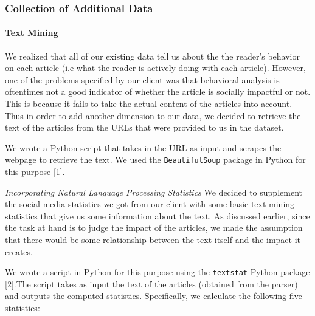 \documentclass[10pt,letterpaper]{article}
\begin{document}
\hypertarget{collection-of-additional-data}{%
\subsubsection{Collection of Additional
Data}\label{collection-of-additional-data}}

\hypertarget{text-mining}{%
\paragraph{Text Mining}\label{text-mining}}

We realized that all of our existing data tell us about the the reader's
behavior on each article (i.e what the reader is actively doing with
each article). However, one of the problems specified by our client was
that behavioral analysis is oftentimes not a good indicator of whether
the article is socially impactful or not. This is because it fails to
take the actual content of the articles into account. Thus in order to
add another dimension to our data, we decided to retrieve the text of
the articles from the URLs that were provided to us in the dataset.

We wrote a Python script that takes in the URL as input and scrapes the
webpage to retrieve the text. We used the \texttt{BeautifulSoup} package
in Python for this purpose {[}1{]}.

\emph{Incorporating Natural Language Processing Statistics} We decided
to supplement the social media statistics we got from our client with
some basic text mining statistics that give us some information about
the text. As discussed earlier, since the task at hand is to judge the
impact of the articles, we made the assumption that there would be some
relationship between the text itself and the impact it creates.

We wrote a script in Python for this purpose using the \texttt{textstat}
Python package {[}2{]}.The script takes as input the text of the
articles (obtained from the parser) and outputs the computed statistics.
Specifically, we calculate the following five statistics:
\end{document}
